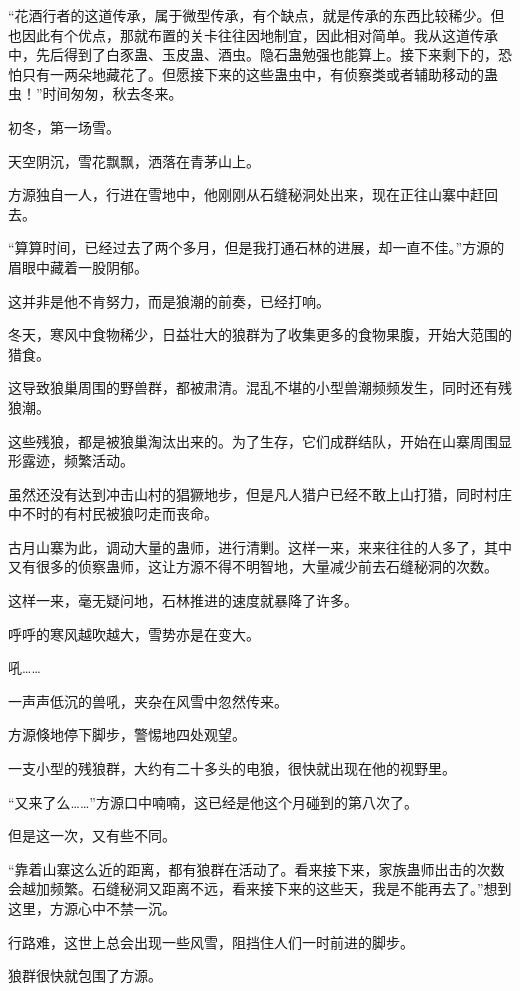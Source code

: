 \begin{this_body}
“花酒行者的这道传承，属于微型传承，有个缺点，就是传承的东西比较稀少。但也因此有个优点，那就布置的关卡往往因地制宜，因此相对简单。我从这道传承中，先后得到了白豕蛊、玉皮蛊、酒虫。隐石蛊勉强也能算上。接下来剩下的，恐怕只有一两朵地藏花了。但愿接下来的这些蛊虫中，有侦察类或者辅助移动的蛊虫！”时间匆匆，秋去冬来。

初冬，第一场雪。

天空阴沉，雪花飘飘，洒落在青茅山上。

方源独自一人，行进在雪地中，他刚刚从石缝秘洞处出来，现在正往山寨中赶回去。

“算算时间，已经过去了两个多月，但是我打通石林的进展，却一直不佳。”方源的眉眼中藏着一股阴郁。

这并非是他不肯努力，而是狼潮的前奏，已经打响。

冬天，寒风中食物稀少，日益壮大的狼群为了收集更多的食物果腹，开始大范围的猎食。

这导致狼巢周围的野兽群，都被肃清。混乱不堪的小型兽潮频频发生，同时还有残狼潮。

这些残狼，都是被狼巢淘汰出来的。为了生存，它们成群结队，开始在山寨周围显形露迹，频繁活动。

虽然还没有达到冲击山村的猖獗地步，但是凡人猎户已经不敢上山打猎，同时村庄中不时的有村民被狼叼走而丧命。

古月山寨为此，调动大量的蛊师，进行清剿。这样一来，来来往往的人多了，其中又有很多的侦察蛊师，这让方源不得不明智地，大量减少前去石缝秘洞的次数。

这样一来，毫无疑问地，石林推进的速度就暴降了许多。

呼呼的寒风越吹越大，雪势亦是在变大。

吼……

一声声低沉的兽吼，夹杂在风雪中忽然传来。

方源倏地停下脚步，警惕地四处观望。

一支小型的残狼群，大约有二十多头的电狼，很快就出现在他的视野里。

“又来了么……”方源口中喃喃，这已经是他这个月碰到的第八次了。

但是这一次，又有些不同。

“靠着山寨这么近的距离，都有狼群在活动了。看来接下来，家族蛊师出击的次数会越加频繁。石缝秘洞又距离不远，看来接下来的这些天，我是不能再去了。”想到这里，方源心中不禁一沉。

行路难，这世上总会出现一些风雪，阻挡住人们一时前进的脚步。

狼群很快就包围了方源。


\end{this_body}
